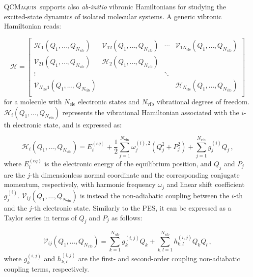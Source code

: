 \documentclass[bibliography=totoc,12pt,a4paper]{scrartcl}
\newcommand{\qcm}{\textsc{QCMaquis}}
\begin{document}
\qcm\ supports also \textit{ab-initio} vibronic Hamiltonians for studying the excited-state dynamics of isolated molecular systems.
A generic vibronic Hamiltonian reads:

\begin{equation}
  \mathcal{H} =
    \begin{bmatrix}
	   \mathcal{H}_1(Q_1,\ldots,Q_{N_\text{vib}})
	     & \mathcal{V}_{12}(Q_1,\ldots,Q_{N_\text{vib}}) 
         & \cdots 
		 & \mathcal{V}_{1 N_\text{ele}}(Q_1,\ldots,Q_{N_\text{vib}}) \\
	   \mathcal{V}_{21}(Q_1,\ldots,Q_{N_\text{vib}})
	     & \mathcal{H}_2(Q_1,\ldots,Q_{N_\text{vib}})
         &  
		 & \\
	  \vdots
	     & 
         & \ddots 
		 & \\
	  \mathcal{V}_{N_\text{ele} 1}(Q_1,\ldots,Q_{N_\text{vib}})
	     &
         &  
		 & \mathcal{H}_{N_\text{ele}}(Q_1,\ldots,Q_{N_\text{vib}}) \\
   \end{bmatrix}
  \label{eq:VibronicHamiltonian}
\end{equation}
%
for a molecule with $N_\text{ele}$ electronic states and $N_\text{vib}$ vibrational degrees of freedom.
$\mathcal{H}_{i}(Q_1,\ldots,Q_{N_\text{vib}})$ represents the vibrational Hamiltonian associated with the $i$-th electronic state, and is expressed as:

\begin{equation}
  \mathcal{H}_{i}(Q_1,\ldots,Q_{N_\text{vib}}) = E_i^{(eq)}
	+ \frac{1}{2} \sum_{j=1}^{N_\text{vib}} \omega_j^{(i),2} \left( Q_j^2  + P_j^2 \right) 
	+ \sum_{j=1}^{N_\text{vib}} g_{j}^{(i)} Q_j \, ,
  \label{eq:DiagonalVibronic}
\end{equation}
%
where $E_i^{(eq)}$ is the electronic energy of the equilibrium position, and $Q_j$ and $P_j$ are the $j$-th dimensionless  normal coordinate and the corresponding conjugate momentum, respectively, with harmonic frequency $\omega_j$ and linear shift coefficient $g_{j}^{(i)}$.
$\mathcal{V}_{ij}(Q_1,\ldots,Q_{N_\text{vib}})$ is instead the non-adiabatic coupling between the $i$-th and the $j$-th electronic state.
Similarly to the PES, it can be expressed as a Taylor series in terms of $Q_j$ and $P_j$ as follows:

\begin{equation}
  \mathcal{V}_{ij}(Q_1,\ldots,Q_{N_\text{vib}}) =
   \sum_{k=1}^{N_\text{vib}} g_k^{(i,j)} Q_k
	+ \sum_{k,l=1}^{N_\text{vib}} h_{k,l}^{(i,j)} Q_k Q_l \, ,
  \label{eq:OffDiagonalVibronic}
\end{equation}
%
where $g_k^{(i,j)}$ and $h_{k,l}^{(i,j)}$ are the first- and second-order coupling non-adiabatic coupling terms, respectively.
\end{document}
